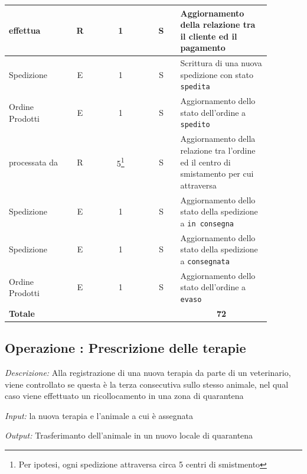 \documentclass[12pt,a4paper]{article}
\begin{document}
\begin{center}
\begin{longtable}{|p{0.2\linewidth}|p{0.1\linewidth}|p{0.175\linewidth}|p{0.1\linewidth}|p{0.3\linewidth}|}
\hline
effettua
 & 
\multicolumn{1}{|c|}{R}
 & 
\multicolumn{1}{|c|}{1}
 & 
\multicolumn{1}{|c|}{S}
 & 
Aggiornamento della relazione tra il cliente ed il pagamento
\\
\hline
Spedizione
 & 
\multicolumn{1}{|c|}{E}
 & 
\multicolumn{1}{|c|}{1}
 & 
\multicolumn{1}{|c|}{S}
 & 
Scrittura di una nuova spedizione con stato \texttt{spedita}
\\
\hline
Ordine Prodotti
 & 
\multicolumn{1}{|c|}{E}
 & 
\multicolumn{1}{|c|}{1}
 & 
\multicolumn{1}{|c|}{S}
 & 
Aggiornamento dello stato dell'ordine a \texttt{spedito}
\\
\hline
processata da
 & 
\multicolumn{1}{|c|}{R}
 & 
\multicolumn{1}{|c|}{5\footnote{Per ipotesi, ogni spedizione attraversa circa 5 centri di smistmento}}
 & 
\multicolumn{1}{|c|}{S}
 & 
Aggiornamento della relazione tra l'ordine ed il centro di smistamento per cui attraversa
\\
\hline
Spedizione
 & 
\multicolumn{1}{|c|}{E}
 & 
\multicolumn{1}{|c|}{1}
 & 
\multicolumn{1}{|c|}{S}
 & 
Aggiornamento dello stato della spedizione a \texttt{in consegna}
\\
\hline
Spedizione
 & 
\multicolumn{1}{|c|}{E}
 & 
\multicolumn{1}{|c|}{1}
 & 
\multicolumn{1}{|c|}{S}
 & 
Aggiornamento dello stato della spedizione a \texttt{consegnata}
\\
\hline
Ordine Prodotti
 & 
\multicolumn{1}{|c|}{E}
 & 
\multicolumn{1}{|c|}{1}
 & 
\multicolumn{1}{|c|}{S}
 & 
Aggiornamento dello stato dell'ordine a \texttt{evaso}
\\
\hline
\multicolumn{4}{|l|}{\textbf{Totale}}
 & 
\multicolumn{1}{|c|}{\textbf{72}}
\\
\hline
\end{longtable}\end{center}

\subsection*{Operazione \thecounterAccessi{}: Prescrizione delle terapie}
\noindent\textit{Descrizione:} Alla registrazione di una nuova terapia da parte di un veterinario, viene controllato se questa è la terza consecutiva sullo stesso animale, nel qual caso viene effettuato un ricollocamento in una zona di quarantena

\noindent\textit{Input:} la nuova terapia e l'animale a cui è assegnata

\noindent\textit{Output:} Trasferimanto dell'animale in un nuovo locale di quarantena
\end{document}
